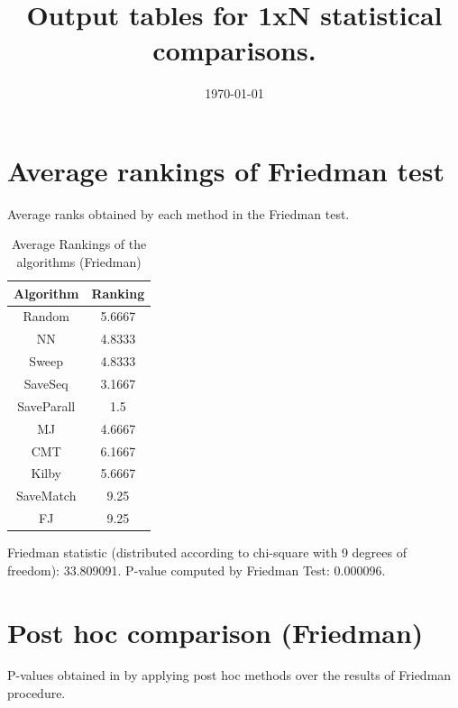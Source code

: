 \documentclass[a4paper,10pt]{article}
\title{Output tables for 1xN statistical comparisons.}
\author{}
\date{\today}
\begin{document}
\begin{landscape}
\pagestyle{empty}
\maketitle
\thispagestyle{empty}

\section{Average rankings of Friedman test}


Average ranks obtained by each method in the Friedman test.

\begin{table}[!htp]
\centering
\begin{tabular}{|c|c|}\hline
Algorithm&Ranking\\\hline
Random&5.6667\\NN&4.8333\\Sweep&4.8333\\SaveSeq&3.1667\\SaveParall&1.5\\MJ&4.6667\\CMT&6.1667\\Kilby&5.6667\\SaveMatch&9.25\\FJ&9.25\\\hline\end{tabular}
\caption{Average Rankings of the algorithms (Friedman)}
\end{table}

Friedman statistic (distributed according to chi-square with 9 degrees of freedom): 33.809091. \newline P-value computed by Friedman Test: 0.000096.\newline


\newpage

\section{Post hoc comparison (Friedman)}


P-values obtained in by applying post hoc methods over the results of Friedman procedure.


\end{landscape}
\end{document}
